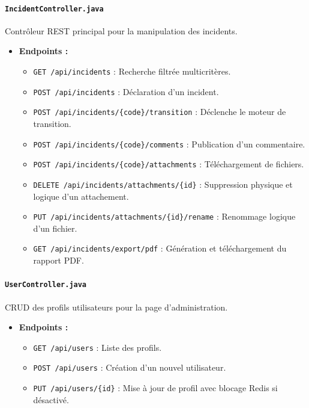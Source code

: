 \documentclass[12pt,a4paper]{article}
\begin{document}
\paragraph{\texttt{IncidentController.java}}
Contrôleur REST principal pour la manipulation des incidents.
\begin{itemize}
    \item \textbf{Endpoints :}
        \begin{itemize}
            \item \texttt{GET /api/incidents} : Recherche filtrée multicritères.
            \item \texttt{POST /api/incidents} : Déclaration d'un incident.
            \item \texttt{POST /api/incidents/\{code\}/transition} : Déclenche le moteur de transition.
            \item \texttt{POST /api/incidents/\{code\}/comments} : Publication d'un commentaire.
            \item \texttt{POST /api/incidents/\{code\}/attachments} : Téléchargement de fichiers.
            \item \texttt{DELETE /api/incidents/attachments/\{id\}} : Suppression physique et logique d'un attachement.
            \item \texttt{PUT /api/incidents/attachments/\{id\}/rename} : Renommage logique d'un fichier.
            \item \texttt{GET /api/incidents/export/pdf} : Génération et téléchargement du rapport PDF.
        \end{itemize}
\end{itemize}

\paragraph{\texttt{UserController.java}}
CRUD des profils utilisateurs pour la page d'administration.
\begin{itemize}
    \item \textbf{Endpoints :}
        \begin{itemize}
            \item \texttt{GET /api/users} : Liste des profils.
            \item \texttt{POST /api/users} : Création d'un nouvel utilisateur.
            \item \texttt{PUT /api/users/\{id\}} : Mise à jour de profil avec blocage Redis si désactivé.
        \end{itemize}
\end{itemize}
\end{document}

